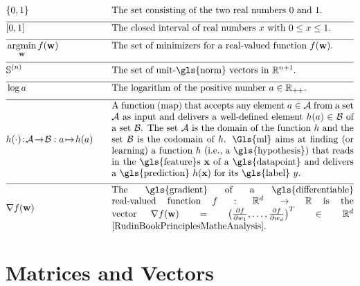 \newpage
\begin{align}
		&\{0,1\}& \quad & \mbox{The set consisting of the two real numbers $0$ and $1$.} \nonumber \\[2mm] \hline \nonumber\\[-5mm]
	&[0,1] &\quad &\mbox{The closed interval of real numbers $x$ with $0 \leq x \leq 1$. }\nonumber \\[2mm] \hline \nonumber\\[-5mm]
    &\argmin_{\weights} f(\weights) &\quad &\mbox{The set of minimizers for a real-valued function $f(\weights)$.  } \nonumber \\[2mm] \hline \nonumber\\[-5mm]
    &\sphere{\nrnodes} &\quad &\mbox{The set of unit-\gls{norm} vectors in $\mathbb{R}^{\nrnodes+1}$.  }\nonumber \\[2mm] \hline \nonumber\\[-5mm]
	 &\log a &\quad &\mbox{The logarithm of the positive number $a \in \mathbb{R}_{++}$.  } \nonumber \\[2mm] \hline \nonumber\\[-5mm]
	 &\hypothesis(\cdot)\!:\!\mathcal{A}\!\rightarrow\!\mathcal{B} :  a \!\mapsto\!h(a) &\quad &\parbox{.75\textwidth}{
	 	A function (map) that accepts any element $a \in \mathcal{A}$ from a set $\mathcal{A}$ 
	 	as input and delivers a well-defined element $h(a) \in \mathcal{B}$ of a set $\mathcal{B}$. 
	 	The set $\mathcal{A}$ is the domain of the function $h$ and the set $\mathcal{B}$ is the 
	 	codomain of $\hypothesis$. \Gls{ml} aims at finding (or learning) a function $\hypothesis$ (i.e., a \gls{hypothesis}) 
	 	that reads in the \gls{feature}s $\featurevec$ of a \gls{datapoint} and delivers a \gls{prediction} $\hypothesis(\featurevec)$
	 	for its \gls{label} $\truelabel$.} \nonumber \\[2mm] \hline \nonumber\\[-5mm]
	 	&\nabla f(\weights) & \quad & \parbox{.75\textwidth}{The \gls{gradient} of a \gls{differentiable} real-valued function 
	 	$f: \mathbb{R}^{\featuredim}\rightarrow \mathbb{R}$ is the vector 
	 	$\nabla f(\weights) = \big( \frac{\partial f}{\partial \weight_{1}},\ldots,\frac{\partial f}{\partial \weight_{\featuredim}}  \big)^{T} \in \mathbb{R}^{\featuredim}$ \cite[Ch. 9]{RudinBookPrinciplesMatheAnalysis}.}   \nonumber
\end{align} 
\section*{Matrices and Vectors} 

